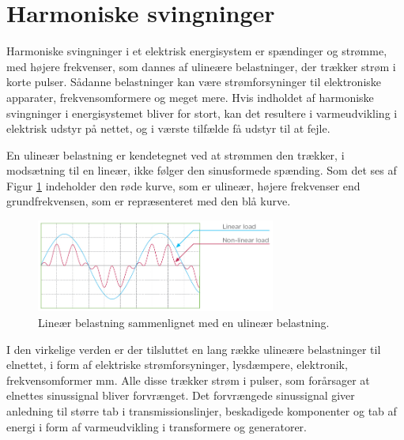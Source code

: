 
\section{Harmoniske svingninger}
\label{sec:THD}
Harmoniske svingninger i et elektrisk energisystem er spændinger og strømme, med højere frekvenser, som dannes af ulineære belastninger, der trækker strøm i korte pulser. Sådanne belastninger kan være strømforsyninger til elektroniske apparater, frekvensomformere og meget mere. Hvis indholdet af harmoniske svingninger i energisystemet bliver for stort, kan det resultere i varmeudvikling i elektrisk udstyr på nettet, og i værste tilfælde få udstyr til at fejle. \newline

En ulineær belastning er kendetegnet ved at strømmen den trækker, i modsætning til en lineær, ikke følger den sinusformede spænding.  Som det ses af Figur \ref{fig:nonLinear} indeholder den røde kurve, som er ulineær, højere frekvenser end grundfrekvensen, som er repræsenteret med den blå kurve. 


\begin{figure}[H] %
	\centering
	\includegraphics[width=0.7\textwidth]{figure/nonLinear}
	\caption{Lineær belastning sammenlignet med en ulineær belastning.}
	\label{fig:nonLinear}
\end{figure}

I den virkelige verden er der tilsluttet en lang række ulineære belastninger til elnettet, i form af elektriske strømforsyninger, lysdæmpere, elektronik, frekvensomformer mm. Alle disse trækker strøm i pulser, som forårsager at elnettes sinussignal bliver forvrænget. Det forvrængede sinussignal giver anledning til større tab i transmissionslinjer, beskadigede komponenter og tab af energi i form af varmeudvikling i transformere og generatorer. \newline

